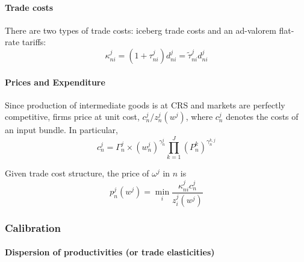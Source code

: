 \paragraph{Trade costs}
There are two types of trade costs: iceberg trade costs and an ad-valorem flat-rate tariffs:
\begin{equation}
    \kappa_{ni}^j = (1 + \tau_{ni}^j) d_{ni}^j = \tilde{\tau}_{ni}^j d_{ni}^j 
\end{equation}


\paragraph{Prices and Expenditure}
Since production of intermediate goods is at CRS and markets are perfectly competitive,
firms price at unit cost, $c_n^j / z_n^j(w^j)$,
where $c_n^j$ denotes the costs of an input bundle.
In particular,
\begin{equation}
    c_n^j = \Gamma_n^j \times (w_n^j)^{\gamma_n^j} \prod_{k=1}^J (P_{n}^k)^{\gamma_n^{k,j}}
\end{equation}

Given trade cost structure, the price of $\omega^j$ in $n$ is 
\begin{equation}
    p_n^j(w^j) = \min_i \frac{\kappa_{ni}^j c_n^j}{z_i^j(w^j)}
\end{equation}


\subsubsection{Calibration}
\paragraph{Dispersion of productivities (or trade elasticities)}